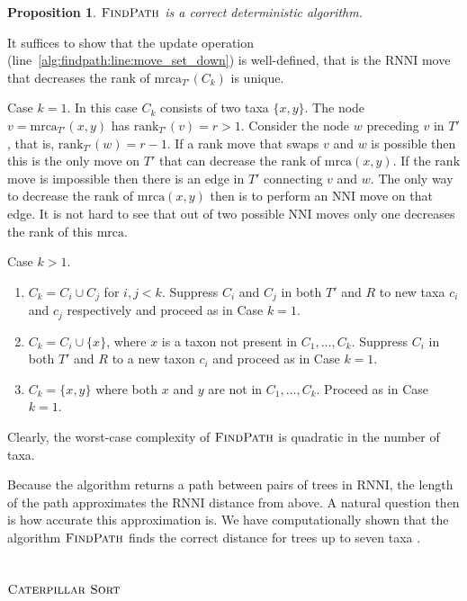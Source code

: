 \documentclass{amsart}
\newcommand{\mrca}{\mathrm{mrca}}
\newcommand{\rank}{\mathrm{rank}}
\newcommand{\nni}{\mathrm{NNI}}
\newcommand{\rnni}{\mathrm{RNNI}}
\newcommand{\csort}{\textsc{Caterpillar Sort}}
\newcommand{\findpath}{\textsc{FindPath}}
\newtheorem{proposition}[theorem]{Proposition}
\begin{document}
\begin{proposition}
$\findpath$ is a correct deterministic algorithm.
\end{proposition}

\proof
It suffices to show that the update operation (line~\ref{alg:findpath:line:move_set_down}) is well-defined, that is the $\rnni$ move that decreases the rank of $\mrca_{T'}(C_k)$ is unique.

Case $k = 1$.
In this case $C_k$ consists of two taxa $\{x, y\}$.
The node $v = \mrca_{T'}(x, y)$ has $\rank_{T'}(v) = r > 1$.
Consider the node $w$ preceding $v$ in $T'$, that is, $\rank_{T'}(w) = r - 1$.
If a rank move that swaps $v$ and $w$ is possible then this is the only move on $T'$ that can decrease the rank of $\mrca(x, y)$.
If the rank move is impossible then there is an edge in $T'$ connecting $v$ and $w$.
The only way to decrease the rank of $\mrca(x, y)$ then is to perform an $\nni$ move on that edge.
It is not hard to see that out of two possible $\nni$ moves only one decreases the rank of this $\mrca$.

Case $k > 1$.
\begin{enumerate}
\item $C_k = C_i \cup C_j$ for $i, j < k$.
Suppress $C_i$ and $C_j$ in both $T'$ and $R$ to new taxa $c_i$ and $c_j$ respectively and proceed as in Case $k = 1$.
\item $C_k = C_i \cup \{x\}$, where $x$ is a taxon not present in $C_1, \ldots, C_k$.
Suppress $C_i$ in both $T'$ and $R$ to a new taxon $c_i$ and proceed as in Case $k = 1$.
\item $C_k = \{x, y\}$ where both $x$ and $y$ are not in $C_1, \ldots, C_k$.
Proceed as in Case $k = 1$.
\end{enumerate}
\endproof

Clearly, the worst-case complexity of $\findpath$ is quadratic in the number of taxa.

Because the algorithm returns a path between pairs of trees in $\rnni$, the length of the path approximates the $\rnni$ distance from above.
A natural question then is how accurate this approximation is.
We have computationally shown that the algorithm $\findpath$ finds the correct distance for trees up to seven taxa \autocite{Collienne2019}.


\subsection{$\csort$}
\label{section:alg_csort}
\end{document}
